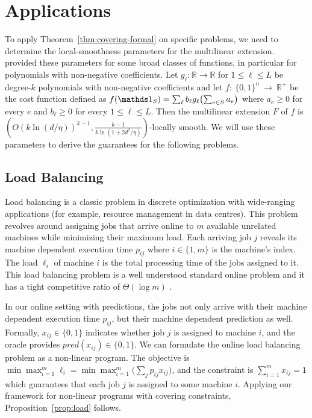 
\section{Applications}	\label{sec:app}
\setcounter{theorem}{0}

To apply Theorem~\ref{thm:covering-formal} on specific problems, we need to determine the local-smoothness parameters for the multilinear extension.
\cite{Thang20:Online-Primal-Dual} provided these parameters for some broad classes of functions, in particular for polynomials with non-negative coefficients. Let $g_{\ell}: \mathbb{R} \rightarrow \mathbb{R}$ for $1 \leq \ell \leq L$
be degree-$k$ polynomials with non-negative coefficients and let $f:~\{0,1\}^{n}~\rightarrow~\mathbb{R}^{+}$ be the cost function
defined as $f(\one_{S}) = \sum_{\ell} b_{\ell} g_{\ell}\bigl( \sum_{e \in S} a_{e} \bigr)$ where $a_{e} \geq 0$ for every
$e$ and $b_{\ell} \geq 0$ for every $1 \leq \ell \leq L$.
Then the multilinear extension $F$ of $f$ is $(O(k \ln(d/\eta))^{k-1}, \frac{k-1}{k \ln(1 + 2d^{2}/\eta)})$-locally smooth.
We will use these parameters to derive the guarantees for the following problems.

\subsection{Load Balancing}

Load balancing is a classic problem in discrete optimization with wide-ranging applications (for example, resource management in data centres).
This problem revolves around assigning jobs that arrive online to $m$ available unrelated machines while minimizing their maximum load.
Each arriving job $j$ reveals its machine dependent execution time $p_{ij}$ where $i \in \{1, m\}$ is the machine's index. The load $\ell_{i}$ of machine $i$ is the total processing time of the jobs assigned
to it. This load balancing problem is a well understood standard online problem and it has a tight competitive ratio of $\Theta(\log m)$ \citep{BorodinEl-Yaniv05:Online-computation,Caragiannis08:Better-bounds}.

In our online setting with predictions, the jobs not only arrive with their machine dependent execution time $p_{ij}$, but their machine dependent prediction as well. Formally, $x_{ij} \in \{0,1\}$ indicates whether job $j$ is assigned to machine $i$, and the oracle provides $pred(x_{ij}) \in \{0,1\}$. We can formulate the online load balancing problem as a non-linear program. The objective is $\min \max_{i=1}^{m} \ell_{i} = \min \max_{i=1}^{m} \bigl(\sum_{j} p_{ij} x_{ij}\bigr)$, and the constraint is $\sum_{i=1}^{m} x_{ij} = 1$ which guarantees that each job $j$ is assigned to some machine $i$. Applying our framework for non-linear programs with covering constraints, Proposition~\ref{prop:load} follows.

